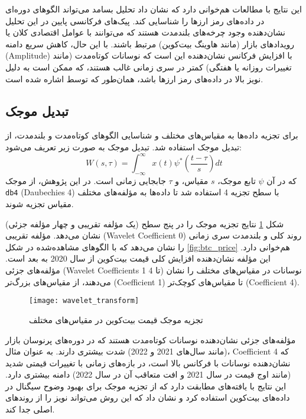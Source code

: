 این نتایج با مطالعات \cite{nguyen2021wavelet} هم‌خوانی دارد که نشان داد تحلیل بسامد می‌تواند الگوهای دوره‌ای در داده‌های رمز ارزها را شناسایی کند. پیک‌های فرکانسی پایین در این تحلیل نشان‌دهنده وجود چرخه‌های بلندمدت هستند که می‌توانند با عوامل اقتصادی کلان یا رویدادهای بازار (مانند هاوینگ بیت‌کوین) مرتبط باشند. با این حال، کاهش سریع دامنه (Amplitude) با افزایش فرکانس نشان‌دهنده این است که نوسانات کوتاه‌مدت (مانند تغییرات روزانه یا هفتگی) کمتر در سری زمانی غالب هستند، که ممکن است به دلیل نویز بالا در داده‌های رمز ارزها باشد، همان‌طور که توسط \cite{fry2018market} اشاره شده است.

\subsection{تبدیل موجک}
برای تجزیه داده‌ها به مقیاس‌های مختلف و شناسایی الگوهای کوتاه‌مدت و بلندمدت، از تبدیل موجک استفاده شد. تبدیل موجک به صورت زیر تعریف می‌شود:
\begin{equation}
	W(s,\tau) = \int_{-\infty}^{\infty} x(t) \psi^*\left(\frac{t-\tau}{s}\right) dt
\end{equation}
که در آن \(\psi\) تابع موجک، \(s\) مقیاس، و \(\tau\) جابجایی زمانی است. در این پژوهش، از موجک \texttt{db4} (Daubechies 4) با سطح تجزیه 4 استفاده شد تا داده‌ها به مؤلفه‌های مختلف مقیاس تجزیه شوند.

شکل \ref{fig:wavelet_transform} نتایج تجزیه موجک را در پنج سطح (یک مؤلفه تقریبی و چهار مؤلفه جزئی) نشان می‌دهد. مؤلفه تقریبی (Wavelet Coefficient 0) روند کلی و بلندمدت سری زمانی را نشان می‌دهد که با الگوهای مشاهده‌شده در شکل \ref{fig:btc_price} هم‌خوانی دارد. این مؤلفه نشان‌دهنده افزایش کلی قیمت بیت‌کوین از سال 2020 به بعد است. مؤلفه‌های جزئی (Wavelet Coefficients 1 تا 4) نوسانات در مقیاس‌های مختلف را نشان می‌دهند، از مقیاس‌های بزرگ‌تر (Coefficient 1) تا مقیاس‌های کوچک‌تر (Coefficient 4).

\begin{figure}[H]
	\centering
	\texttt{[image: wavelet\_transform]}
	\caption{تجزیه موجک قیمت بیت‌کوین در مقیاس‌های مختلف}
	\label{fig:wavelet_transform}
\end{figure}

مؤلفه‌های جزئی نشان‌دهنده نوسانات کوتاه‌مدت هستند که در دوره‌های پرنوسان بازار (مانند سال‌های 2021 و 2022) شدت بیشتری دارند. به عنوان مثال، Coefficient 4 که نشان‌دهنده نوسانات با فرکانس بالا است، در بازه‌های زمانی با تغییرات قیمتی شدید (مانند اوج قیمت در سال 2021 و افت متعاقب آن در سال 2022) دامنه بیشتری دارد. این نتایج با یافته‌های \cite{lahmiri2018chaos} مطابقت دارد که از تجزیه موجک برای بهبود وضوح سیگنال در داده‌های بیت‌کوین استفاده کرد و نشان داد که این روش می‌تواند نویز را از روندهای اصلی جدا کند.


